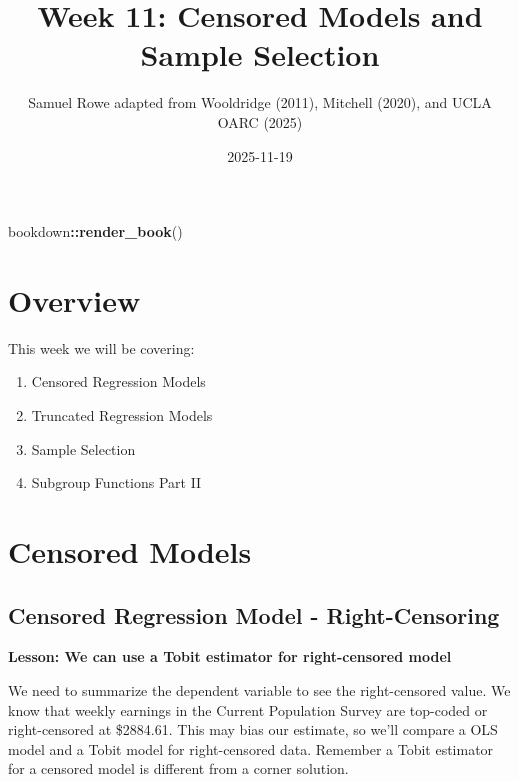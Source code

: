 \documentclass[
]{book}
\title{Week 11: Censored Models and Sample Selection}
\author{Samuel Rowe adapted from Wooldridge (2011), Mitchell (2020), and UCLA OARC (2025)}
\date{2025-11-19}
\newenvironment{Shaded}{\begin{snugshade}}{\end{snugshade}}
\newcommand{\FunctionTok}[1]{\textcolor[rgb]{0.13,0.29,0.53}{\textbf{#1}}}
\newcommand{\NormalTok}[1]{#1}
\newcommand{\SpecialCharTok}[1]{\textcolor[rgb]{0.81,0.36,0.00}{\textbf{#1}}}
\providecommand{\tightlist}{%
  \setlength{\itemsep}{0pt}\setlength{\parskip}{0pt}}
\begin{document}
\maketitle

{
\setcounter{tocdepth}{1}
\tableofcontents
}
\begin{Shaded}
\begin{Highlighting}[]
\NormalTok{bookdown}\SpecialCharTok{::}\FunctionTok{render\_book}\NormalTok{()}
\end{Highlighting}
\end{Shaded}

\chapter*{Overview}\label{overview}

This week we will be covering:

\begin{enumerate}
\def\labelenumi{\arabic{enumi}.}
\tightlist
\item
  Censored Regression Models
\item
  Truncated Regression Models
\item
  Sample Selection
\item
  Subgroup Functions Part II
\end{enumerate}

\chapter{Censored Models}\label{censored-models}

\section{Censored Regression Model - Right-Censoring}\label{censored-regression-model---right-censoring}

\textbf{Lesson: We can use a Tobit estimator for right-censored model}

We need to summarize the dependent variable to see the right-censored value. We know that weekly earnings in the Current Population Survey are top-coded or right-censored at \$2884.61. This may bias our estimate, so we'll compare a OLS model and a Tobit model for right-censored data. Remember a Tobit estimator for a censored model is different from a corner solution.
\end{document}
